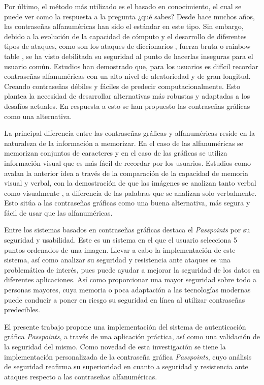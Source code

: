 Por último, el método más utilizado es el basado en conocimiento, el cual se puede ver como la respuesta a la pregunta ¿qué sabes? Desde hace muchos años, las contraseñas alfanuméricas han sido el estándar en este tipo. Sin embargo, debido a la evolución de la capacidad de cómputo y el desarrollo de diferentes tipos de ataques, como son los ataques de diccionarios  \cite{10.1145/1102120.1102168}, fuerza bruta  \cite{Apostol2012BruteforceA} o rainbow table  \cite{wahab2024investigating}, se ha visto debilitada su seguridad al punto de hacerlas inseguras para el usuario común. Estudios han demostrado que, para los usuarios es difícil recordar contraseñas alfanuméricas con un alto nivel de aleatoriedad y de gran longitud. Creando contraseñas débiles y fáciles de predecir computacionalmente. Esto plantea la necesidad de desarrollar alternativas más robustas y adaptadas a los desafíos actuales. En respuesta a esto se han propuesto las contraseñas gráficas como una alternativa.

La principal diferencia entre las contraseñas gráficas y alfanuméricas reside en la naturaleza de la información a memorizar. En el caso de las alfanuméricas se memorizan conjuntos de caracteres y en el caso de las gráficas se utiliza información visual que es más fácil de recordar por los usuarios. Estudios como  \cite{paivio2013imagery, shepard1967recognition, nelson1976pictorial}  avalan la anterior idea a través de la comparación de la capacidad de memoria visual y verbal, con la demostración de que las imágenes se analizan tanto verbal como visualmente  \cite{shepard1967recognition}, a diferencia de las palabras que se analizan solo verbalmente. Esto sitúa a las contraseñas gráficas como una buena alternativa, más segura y fácil de usar que las alfanuméricas.

Entre los sistemas basados en contraseñas gráficas destaca el \textit{Passpoints}  \cite{wiedenbeck2005passpoints} por su seguridad y usabilidad. Este es un sistema en el que el usuario selecciona 5 puntos ordenados de una imagen. Llevar a cabo la implementación de este sistema, así como analizar su seguridad y resistencia ante ataques es una problemática de interés, pues puede ayudar a mejorar la seguridad de los datos en diferentes aplicaciones. Así como proporcionar una mayor seguridad sobre todo a personas mayores, cuya memoria o poca adaptación a las tecnologías modernas puede conducir a poner en riesgo su seguridad en línea al utilizar contraseñas predecibles.

El presente trabajo propone una implementación del sistema de autenticación gráfica \textit{Passpoints}, a través de una aplicación práctica, así como una validación de la seguridad del mismo. Como novedad de esta investigación se tiene la implementación personalizada de la contraseña gráfica \textit{Passpoints}, cuyo análisis de seguridad reafirma su superioridad en cuanto a seguridad y resistencia ante ataques respecto a las contraseñas alfanuméricas.



